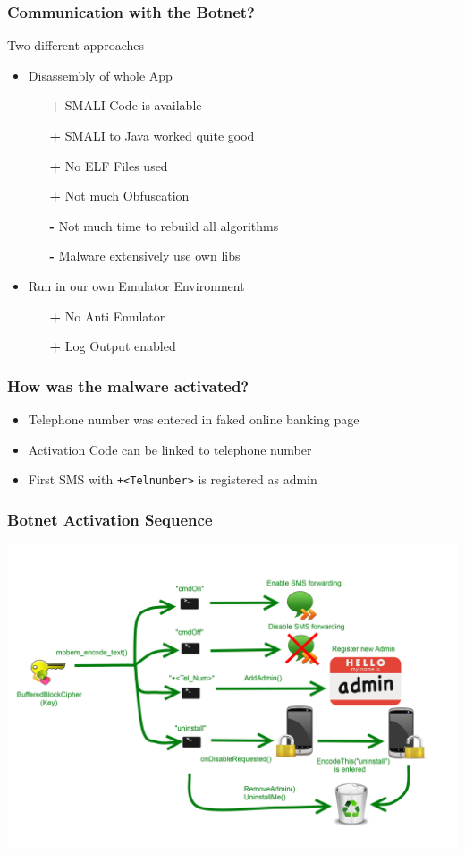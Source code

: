 \documentclass[12pt,a4paper]{beamer}
\begin{document}
\begin{frame}
\frametitle{Communication with the Botnet?}
Two different approaches
\begin{itemize}
	\item Disassembly of whole App 
		\begin{itemize}
			\item[\textbf{\color{green}+}] SMALI Code is available
			\item[\textbf{\color{green}+}] SMALI to Java worked quite good
			\item[\textbf{\color{green}+}] No ELF Files used
			\item[\textbf{\color{green}+}] Not much Obfuscation
			\item[\textbf{\color{red}-}] Not much time to rebuild all algorithms
			\item[\textbf{\color{red}-}] Malware extensively use own libs 
		\end{itemize}
	\item Run in our own Emulator Environment
				\begin{itemize}
			\item[\textbf{\color{green}+}] No Anti Emulator
			\item[\textbf{\color{green}+}] Log Output enabled
		\end{itemize}
\end{itemize}

\end{frame}


\begin{frame}
\frametitle{How was the malware activated?}
\begin{itemize}
\item Telephone number was entered in faked online banking page
\item Activation Code can be linked to telephone number
\item First SMS with \texttt{+<Telnumber>} is registered as admin
\end{itemize}

\end{frame}


\begin{frame}
\frametitle{Botnet Activation Sequence}
\includegraphics[height=0.9\textheight]{images/behaviour.png}
\end{frame}
\end{document}
